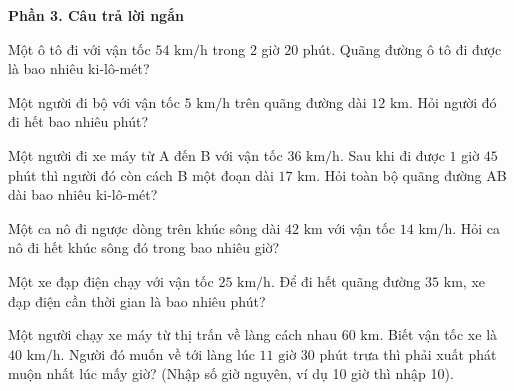 \textbf{Phần 3. Câu trả lời ngắn}

\begin{ex} %
Một ô tô đi với vận tốc $54\text{ km/h}$ trong $2$ giờ $20$ phút. Quãng đường ô tô đi được là bao nhiêu ki-lô-mét?
\end{ex}

\begin{ex} %
Một người đi bộ với vận tốc $5\text{ km/h}$ trên quãng đường dài $12\text{ km}$. Hỏi người đó đi hết bao nhiêu phút?
\end{ex}

\begin{ex} %
Một người đi xe máy từ A đến B với vận tốc $36\text{ km/h}$. Sau khi đi được $1$ giờ $45$ phút thì người đó còn cách B một đoạn dài $17\text{ km}$. Hỏi toàn bộ quãng đường AB dài bao nhiêu ki-lô-mét?
\end{ex}

\begin{ex} %
Một ca nô đi ngược dòng trên khúc sông dài $42\text{ km}$ với vận tốc $14\text{ km/h}$. Hỏi ca nô đi hết khúc sông đó trong bao nhiêu giờ?
\end{ex}

\begin{ex} %
Một xe đạp điện chạy với vận tốc $25\text{ km/h}$. Để đi hết quãng đường $35\text{ km}$, xe đạp điện cần thời gian là bao nhiêu phút?
\end{ex}

\begin{ex} %
Một người chạy xe máy từ thị trấn về làng cách nhau $60\text{ km}$. Biết vận tốc xe là $40\text{ km/h}$. Người đó muốn về tới làng lúc $11\text{ giờ } 30\text{ phút}$ trưa thì phải xuất phát muộn nhất lúc mấy giờ? (Nhập số giờ nguyên, ví dụ 10 giờ thì nhập 10).
\end{ex}
